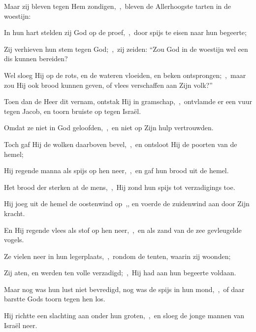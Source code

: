 \documentclass[12pt,twoside,a5paper]{article}
\begin{document}
\begin{halfparskip}

  Maar zij bleven tegen Hem zondigen,~\sep\ bleven de Allerhoogste tarten in de woestijn:

  In hun hart stelden zij God op de proef,~\sep\ door spijs te eisen naar hun begeerte;

  Zij verhieven hun stem tegen God;~\sep\ zij zeiden: ``Zou God in de woestijn wel een dis kunnen bereiden?

  Wel sloeg Hij op de rots, en de wateren vloeiden, en beken ontsprongen;~\sep\ maar zou Hij ook brood kunnen geven, of vlees verschaffen aan Zijn volk?''

  Toen dan de Heer dit vernam, ontstak Hij in gramschap,~\sep\ ontvlamde er een vuur tegen Jacob, en toorn bruiste op tegen Israël.

  Omdat ze niet in God geloofden,~\sep\ en niet op Zijn hulp vertrouwden.

  Toch gaf Hij de wolken daarboven bevel,~\sep\ en ontsloot Hij de poorten van de hemel;

  Hij regende manna als spijs op hen neer,~\sep\ en gaf hun brood uit de hemel.

  Het brood der sterken at de mens,~\sep\ Hij zond hun spijs tot verzadigings toe.

  Hij joeg uit de hemel de oostenwind op~\sep , en voerde de zuidenwind aan door Zijn kracht.

  En Hij regende vlees als stof op hen neer,~\sep\ en als zand van de zee gevleugelde vogels.

  Ze vielen neer in hun legerplaats,~\sep\ rondom de tenten, waarin zij woonden;

  Zij aten, en werden ten volle verzadigd;~\sep\ Hij had aan hun begeerte voldaan.

  Maar nog was hun lust niet bevredigd, nog was de spijs in hun mond,~\sep\ of daar barstte Gods toorn tegen hen los.

  Hij richtte een slachting aan onder hun groten,~\sep\ en sloeg de jonge mannen van Israël neer.
\end{halfparskip}
\end{document}
